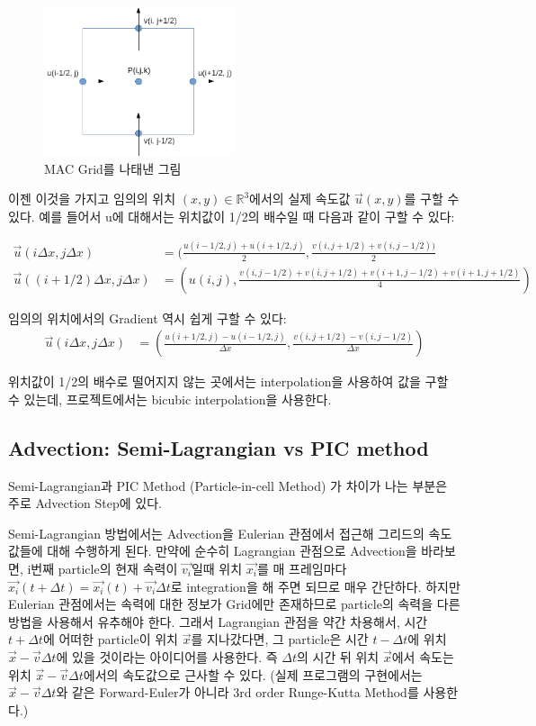 \documentclass[10pt, A4]{article}
\begin{document}
\begin{figure}[h]
\centering
\includegraphics[width=0.5\textwidth]{mac_grid}
\caption{MAC Grid를 나태낸 그림}
\end{figure}

이젠 이것을 가지고 임의의 위치 $(x, y) \in \mathbb{R}^3$에서의 실제 속도값 $\vec{u}(x, y)$를 구할 수 있다. 예를 들어서 u에 대해서는 위치값이 1/2의 배수일 때 다음과 같이 구할 수 있다:

\begin{align*} 
  \vec{u}(i \Delta x, j \Delta x) &= (\frac{u(i-1/2, j) + u(i+1/2, j)}{2}, \frac{v(i,j+1/2) + v(i,j-1/2))}{2} \\
  \vec{u}((i+1/2) \Delta x, j \Delta x) &= (u(i,j), \frac{v(i,j-1/2) + v(i,j+1/2) + v(i+1,j-1/2) + v(i+1,j+1/2)}{4})
\end{align*}

임의의 위치에서의 Gradient 역시 쉽게 구할 수 있다:
\begin{align*}
  \vec{u}(i \Delta x, j \Delta x) &= (\frac{u(i+1/2, j) - u(i-1/2, j)}{\Delta x}, \frac{v(i,j+1/2) - v(i,j-1/2)}{\Delta x})
\end{align*}

위치값이 1/2의 배수로 떨어지지 않는 곳에서는 interpolation을 사용하여 값을 구할 수 있는데, 프로젝트에서는 bicubic interpolation을 사용한다.

\subsection{Advection: Semi-Lagrangian vs PIC method}

Semi-Lagrangian과 PIC Method (Particle-in-cell Method) 가 차이가 나는 부분은 주로 Advection Step에 있다. 

Semi-Lagrangian 방법에서는 Advection을 Eulerian 관점에서 접근해 그리드의 속도 값들에 대해 수행하게 된다. 만약에 순수히 Lagrangian 관점으로 Advection을 바라보면, i번째 particle의 현재 속력이 $\vec{v_i}$일때 위치 $\vec{x_i}$를 매 프레임마다 $\vec{x_i}(t + \Delta t) = \vec{x_i}(t) + \vec{v_i} \Delta t$로 integration을 해 주면 되므로 매우 간단하다. 하지만 Eulerian 관점에서는 속력에 대한 정보가 Grid에만 존재하므로 particle의 속력을 다른 방법을 사용해서 유추해야 한다. 그래서 Lagrangian 관점을 약간 차용해서, 시간 $t + \Delta t$에 어떠한 particle이 위치 $\vec{x}$를 지나갔다면, 그 particle은 시간 $t - \Delta t$에 위치 $\vec{x} - \vec{v} \Delta t$에 있을 것이라는 아이디어를 사용한다. 즉 $\Delta t$의 시간 뒤 위치 $\vec{x}$에서 속도는 위치 $\vec{x} - \vec{v} \Delta t$에서의 속도값으로 근사할 수 있다. (실제 프로그램의 구현에서는 $\vec{x} - \vec{v} \Delta t$와 같은 Forward-Euler가 아니라 3rd order Runge-Kutta Method를 사용한다.) \cite[p.29-33]{fluid-sim-cg}
\end{document}
